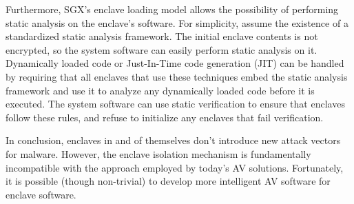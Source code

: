 Furthermore, SGX's enclave loading model allows the possibility of performing
static analysis on the enclave's software. For simplicity, assume the existence
of a standardized static analysis framework.  The initial enclave contents is
not encrypted, so the system software can easily perform static analysis on it.
Dynamically loaded code or Just-In-Time code generation (JIT) can be handled by
requiring that all enclaves that use these techniques embed the static analysis
framework and use it to analyze any dynamically loaded code before it is
executed. The system software can use static verification to ensure that
enclaves follow these rules, and refuse to initialize any enclaves that fail
verification.

In conclusion, enclaves in and of themselves don't introduce new attack vectors
for malware. However, the enclave isolation mechanism is fundamentally
incompatible with the approach employed by today's AV solutions. Fortunately,
it is possible (though non-trivial) to develop more intelligent AV software for
enclave software.
